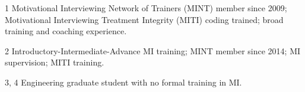 \begin{table}[!ht]
\begin{threeparttable}
		\begin{tablenotes}
			\footnotesize
			\item[1]
			Motivational Interviewing Network of Trainers (MINT) member since 2009;
			Motivational Interviewing Treatment Integrity (MITI) coding trained; broad training
			and coaching experience.
			\item[2]
			Introductory-Intermediate-Advance MI training;
			MINT member since 2014;
			MI supervision; MITI training.
			\item[3, 4]
			Engineering graduate student with no formal training in MI.
		\end{tablenotes}

	\end{threeparttable}
\end{table}
